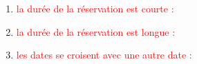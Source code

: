 \documentclass{article}
\begin{document}
\begin{enumerate}
\begin{enumerate}
               \noindent{}
  \item \textcolor{red}{la durée de la réservation est courte :} 
  \vspace{0.7cm}
               \hspace*{-0.7in}

               \noindent{}
  \item \textcolor{red}{la durée de la réservation est longue :} 
  \vspace{0.7cm}
               \hspace*{-0.7in}

               \noindent{}
  \item \textcolor{red}{les dates se croisent avec une autre date :} 
  \vspace{0.7cm}
               \hspace*{-0.7in}


\end{enumerate}
\end{enumerate}
\end{document}
